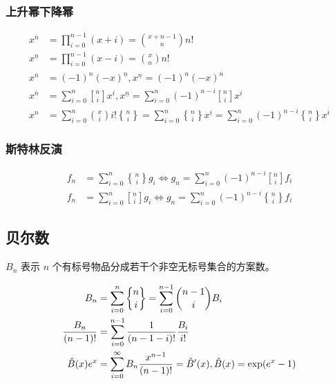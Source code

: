 \subsubsection{上升幂下降幂}

$$
\begin{aligned}
x^{\overline{n}} &=\prod_{i=0}^{n-1}(x+i)={x+n-1\choose n}n!\\
x^{\underline{n}} &=\prod_{i=0}^{n-1}(x-i)={x\choose n}n!\\
x^{\overline{n}} &=(-1)^{n}(-x)^{\underline{n}},x^{\underline{n}}=(-1)^{n}(-x)^{\overline{n}}\\
x^{\overline{n}} &=\sum_{i=0}^{n}{n\brack i}x^i,x^{\underline{n}}=\sum_{i=0}^{n}(-1)^{n-i}{n\brack i}x^i\\
x^n &=\sum_{i=0}^{n}{x\choose i}i!{n\brace i}=\sum_{i=0}^{n}{n\brace i}x^{\underline{i}}=\sum_{i=0}^{n}(-1)^{n-i}{n\brace i}x^{\overline{i}}
\end{aligned}
$$

\subsubsection{斯特林反演}

$$
\begin{aligned}
f_n &=\sum_{i=0}^{n}{n\brace i}g_i\Leftrightarrow g_n=\sum_{i=0}^{n}(-1)^{n-i}{n\brack i}f_i\\
f_n &=\sum_{i=0}^{n}{n\brack i}g_i\Leftrightarrow g_n=\sum_{i=0}^{n}(-1)^{n-i}{n\brace i}f_i
\end{aligned}
$$

\subsection{贝尔数}

$B_n$ 表示 $n$ 个有标号物品分成若干个非空无标号集合的方案数。

$$
\begin{aligned}
B_n &=\sum_{i=0}^{n}{n\brace i}=\sum_{i=0}^{n-1}{n-1\choose i}B_i\\
{B_n\over(n-1)!} &=\sum_{i=0}^{n-1}{1\over(n-1-i)!}{B_i\over i!}\\
\hat B(x)e^x &=\sum_{i=0}^{\infty}B_n{x^{n-1}\over(n-1)!}=\hat B'(x),\hat B(x)=\exp(e^x-1)
\end{aligned}
$$
